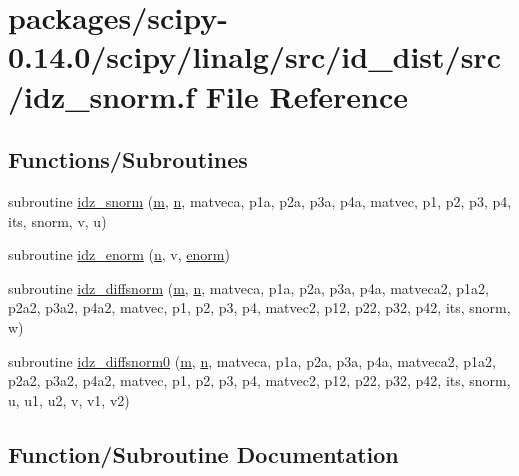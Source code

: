 \hypertarget{idz__snorm_8f}{}\section{packages/scipy-\/0.14.0/scipy/linalg/src/id\+\_\+dist/src/idz\+\_\+snorm.f File Reference}
\label{idz__snorm_8f}
\subsection*{Functions/\+Subroutines}
\begin{DoxyCompactItemize}
\item 
subroutine \hyperlink{idz__snorm_8f_ad562ac01e8872a62c38d054fb2b439bf}{idz\+\_\+snorm} (\hyperlink{indexexpr_8h_ab72fdb4031d47b75ab26dd18a437bcdc}{m}, \hyperlink{indexexpr_8h_ab427e2e2b4d6cec55fa088ea2a692ace}{n}, matveca, p1a, p2a, p3a, p4a, matvec, p1, p2, p3, p4, its, snorm, v, u)
\item 
subroutine \hyperlink{idz__snorm_8f_add15fd84aceb98c92a719454dd662a1f}{idz\+\_\+enorm} (\hyperlink{indexexpr_8h_ab427e2e2b4d6cec55fa088ea2a692ace}{n}, v, \hyperlink{enorm_8f_afa3026fec2903ac5b425637b0293e6c5}{enorm})
\item 
subroutine \hyperlink{idz__snorm_8f_ac05051b1aaf73ab201d9f01dbc120326}{idz\+\_\+diffsnorm} (\hyperlink{indexexpr_8h_ab72fdb4031d47b75ab26dd18a437bcdc}{m}, \hyperlink{indexexpr_8h_ab427e2e2b4d6cec55fa088ea2a692ace}{n}, matveca, p1a, p2a, p3a, p4a, matveca2, p1a2, p2a2, p3a2, p4a2, matvec, p1, p2, p3, p4, matvec2, p12, p22, p32, p42, its, snorm, w)
\item 
subroutine \hyperlink{idz__snorm_8f_a17d1875cc25a41535638dae11f8071cb}{idz\+\_\+diffsnorm0} (\hyperlink{indexexpr_8h_ab72fdb4031d47b75ab26dd18a437bcdc}{m}, \hyperlink{indexexpr_8h_ab427e2e2b4d6cec55fa088ea2a692ace}{n}, matveca, p1a, p2a, p3a, p4a, matveca2, p1a2, p2a2, p3a2, p4a2, matvec, p1, p2, p3, p4, matvec2, p12, p22, p32, p42, its, snorm, u, u1, u2, v, v1, v2)
\end{DoxyCompactItemize}


\subsection{Function/\+Subroutine Documentation}
\hypertarget{idz__snorm_8f_ac05051b1aaf73ab201d9f01dbc120326}{}
